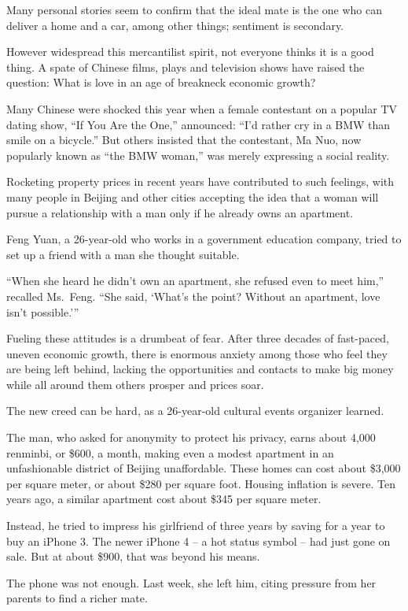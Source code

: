 ﻿\documentclass[12pt]{article}
\begin{document}
Many personal stories seem to confirm that the ideal mate is the one who can deliver a home and a
car, among other things; sentiment is secondary.

However widespread this mercantilist spirit, not everyone thinks it is a good thing. A spate of
Chinese films, plays and television shows have raised the question: What is love in an age of
breakneck economic growth?

Many Chinese were shocked this year when a female contestant on a popular TV dating show, ``If You
Are the One,'' announced: ``I'd rather cry in a BMW than smile on a bicycle.'' But others insisted
that the contestant, Ma Nuo, now popularly known as ``the BMW woman,'' was merely expressing a
social reality.

Rocketing property prices in recent years have contributed to such feelings, with many people in
Beijing and other cities accepting the idea that a woman will pursue a relationship with a man only
if he already owns an apartment.

Feng Yuan, a 26-year-old who works in a government education company, tried to set up a friend with
a man she thought suitable.

``When she heard he didn't own an apartment, she refused even to meet him,'' recalled Ms.~Feng.
``She said, `What's the point? Without an apartment, love isn't possible.'''

Fueling these attitudes is a drumbeat of fear. After three decades of fast-paced, uneven economic
growth, there is enormous anxiety among those who feel they are being left behind, lacking the
opportunities and contacts to make big money while all around them others prosper and prices soar.

The new creed can be hard, as a 26-year-old cultural events organizer learned.

The man, who asked for anonymity to protect his privacy, earns about 4,000 renminbi, or \$600, a
month, making even a modest apartment in an unfashionable district of Beijing unaffordable. These
homes can cost about \$3,000 per square meter, or about \$280 per square foot. Housing inflation is
severe. Ten years ago, a similar apartment cost about \$345 per square meter.

Instead, he tried to impress his girlfriend of three years by saving for a year to buy an iPhone 3.
The newer iPhone 4 -- a hot status symbol -- had just gone on sale. But at about \$900, that was
beyond his means.

The phone was not enough. Last week, she left him, citing pressure from her parents to find a richer
mate.
\end{document}
